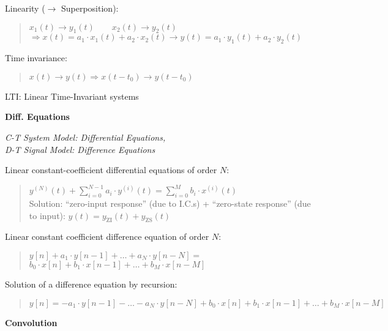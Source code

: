 \documentclass[fontsize=9pt,a4paper,twocolumn]{scrartcl}
\begin{document}
Linearity ($\to$ Superposition):
\begin{quote}
	$x_1(t)\to y_1(t)\qquad x_2(t)\to y_2(t)$\\
	$\Rightarrow x(t)=a_1\cdot x_1(t)+a_2\cdot x_2(t)\to y(t)=a_1\cdot y_1(t)+a_2\cdot y_2(t)$
\end{quote}

Time invariance:
\begin{quote}
	$x(t)\to y(t)\Rightarrow x(t-t_0)\to y(t-t_0)$
\end{quote}

LTI: Linear Time-Invariant systems


\large{\textbf{Diff. Equations}}

\textit{C-T System Model: Differential Equations,\\ D-T Signal Model: Difference Equations}

Linear constant-coefficient differential equations of order $N$:
\begin{quote}
	$y^{(N)}(t)+\sum_{i=0}^{N-1} a_i\cdot y^{(i)}(t) = \sum_{i=0}^M b_i\cdot x^{(i)}(t)$\\
	Solution: ``zero-input response'' (due to I.C.s) + ``zero-state response'' (due to input): $y(t) = y_\mathrm{ZI}(t)+y_\mathrm{ZS}(t)$
\end{quote}


Linear constant coefficient difference equation of order $N$:
\begin{quote}
	$y[n]+a_1\cdot y[n-1]+\dots+a_N\cdot y[n-N] =$\\ $b_0\cdot x[n]+b_1\cdot x[n-1]+\dots+b_M\cdot x[n-M]$
\end{quote}

Solution of a difference equation by recursion:
\begin{quote}
	$y[n]=-a_1\cdot y[n-1]-\dots-a_N\cdot y[n-N]+b_0\cdot x[n]+b_1\cdot x[n-1]+\dots+b_M\cdot x[n-M]$
\end{quote}

\large{\textbf{Convolution}}
\end{document}
